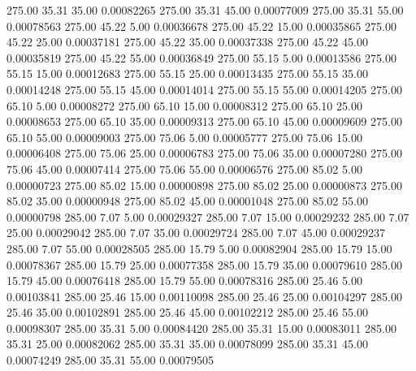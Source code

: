     275.00     35.31     35.00     0.00082265
    275.00     35.31     45.00     0.00077009
    275.00     35.31     55.00     0.00078563
    275.00     45.22      5.00     0.00036678
    275.00     45.22     15.00     0.00035865
    275.00     45.22     25.00     0.00037181
    275.00     45.22     35.00     0.00037338
    275.00     45.22     45.00     0.00035819
    275.00     45.22     55.00     0.00036849
    275.00     55.15      5.00     0.00013586
    275.00     55.15     15.00     0.00012683
    275.00     55.15     25.00     0.00013435
    275.00     55.15     35.00     0.00014248
    275.00     55.15     45.00     0.00014014
    275.00     55.15     55.00     0.00014205
    275.00     65.10      5.00     0.00008272
    275.00     65.10     15.00     0.00008312
    275.00     65.10     25.00     0.00008653
    275.00     65.10     35.00     0.00009313
    275.00     65.10     45.00     0.00009609
    275.00     65.10     55.00     0.00009003
    275.00     75.06      5.00     0.00005777
    275.00     75.06     15.00     0.00006408
    275.00     75.06     25.00     0.00006783
    275.00     75.06     35.00     0.00007280
    275.00     75.06     45.00     0.00007414
    275.00     75.06     55.00     0.00006576
    275.00     85.02      5.00     0.00000723
    275.00     85.02     15.00     0.00000898
    275.00     85.02     25.00     0.00000873
    275.00     85.02     35.00     0.00000948
    275.00     85.02     45.00     0.00001048
    275.00     85.02     55.00     0.00000798
    285.00      7.07      5.00     0.00029327
    285.00      7.07     15.00     0.00029232
    285.00      7.07     25.00     0.00029042
    285.00      7.07     35.00     0.00029724
    285.00      7.07     45.00     0.00029237
    285.00      7.07     55.00     0.00028505
    285.00     15.79      5.00     0.00082904
    285.00     15.79     15.00     0.00078367
    285.00     15.79     25.00     0.00077358
    285.00     15.79     35.00     0.00079610
    285.00     15.79     45.00     0.00076418
    285.00     15.79     55.00     0.00078316
    285.00     25.46      5.00     0.00103841
    285.00     25.46     15.00     0.00110098
    285.00     25.46     25.00     0.00104297
    285.00     25.46     35.00     0.00102891
    285.00     25.46     45.00     0.00102212
    285.00     25.46     55.00     0.00098307
    285.00     35.31      5.00     0.00084420
    285.00     35.31     15.00     0.00083011
    285.00     35.31     25.00     0.00082062
    285.00     35.31     35.00     0.00078099
    285.00     35.31     45.00     0.00074249
    285.00     35.31     55.00     0.00079505
